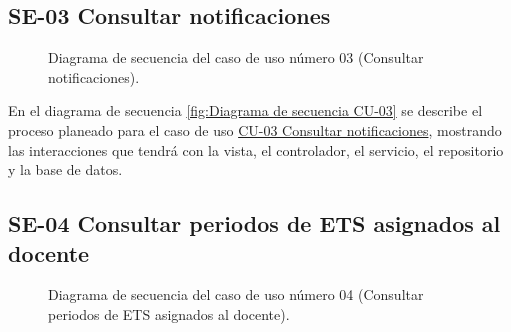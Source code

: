 \newpage

\subsection{SE-03 Consultar notificaciones}

\begin{figure}[htbp!]
	\begin{center}
		\caption{Diagrama de secuencia del caso de uso número 03 (Consultar notificaciones).}
		\label{fig:Diagrama se secuencia CU-03}
	\end{center}
\end{figure}

En el diagrama de secuencia \ref{fig:Diagrama de secuencia CU-03} se describe el proceso planeado para el caso de uso \hyperlink{CU-03}{CU-03 Consultar notificaciones}, mostrando las interacciones que tendrá con la vista, el controlador, el servicio, el repositorio y la base de datos.

\newpage

\subsection{SE-04 Consultar periodos de ETS asignados al docente}

\begin{figure}[htbp!]
	\begin{center}
		\caption{Diagrama de secuencia del caso de uso número 04 (Consultar periodos de ETS asignados al docente).}
		\label{fig:Diagrama de secuencia CU-04}
	\end{center}
\end{figure}


